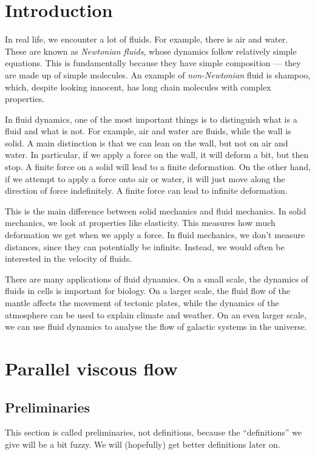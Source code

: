 \documentclass[a4paper]{article}
\begin{document}
\tableofcontents
\setcounter{section}{-1}
\section{Introduction}
In real life, we encounter a lot of fluids. For example, there is air and water. These are known as \emph{Newtonian fluids}, whose dynamics follow relatively simple equations. This is fundamentally because they have simple composition --- they are made up of simple molecules. An example of \emph{non-Newtonian} fluid is shampoo, which, despite looking innocent, has long chain molecules with complex properties.

In fluid dynamics, one of the most important things is to distinguish what is a fluid and what is not. For example, air and water are fluids, while the wall is solid. A main distinction is that we can lean on the wall, but not on air and water. In particular, if we apply a force on the wall, it will deform a bit, but then stop. A finite force on a solid will lead to a finite deformation. On the other hand, if we attempt to apply a force onto air or water, it will just move along the direction of force indefinitely. A finite force can lead to infinite deformation.

This is the main difference between solid mechanics and fluid mechanics. In solid mechanics, we look at properties like elasticity. This measures how much deformation we get when we apply a force. In fluid mechanics, we don't measure distances, since they can potentially be infinite. Instead, we would often be interested in the velocity of fluids.

There are many applications of fluid dynamics. On a small scale, the dynamics of fluids in cells is important for biology. On a larger scale, the fluid flow of the mantle affects the movement of tectonic plates, while the dynamics of the atmosphere can be used to explain climate and weather. On an even larger scale, we can use fluid dynamics to analyse the flow of galactic systems in the universe.

\section{Parallel viscous flow}
\setcounter{subsection}{-1}
\subsection{Preliminaries}
This section is called preliminaries, not definitions, because the ``definitions'' we give will be a bit fuzzy. We will (hopefully) get better definitions later on.
\end{document}
